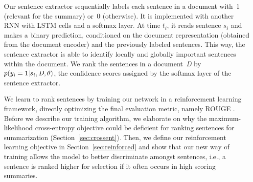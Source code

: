 \documentclass[11pt,a4paper]{article}
\newcommand\doc{{\it D }}
\begin{document}
Our sentence extractor sequentially labels each sentence in a document
with~$1$ (relevant for the summary) or~$0$ (otherwise). It is
implemented with another RNN with LSTM cells and a softmax layer. At
time $t_i$, it reads sentence $s_i$ and makes a binary prediction,
conditioned on the document representation (obtained from the document
encoder) and the previously labeled sentences. This way, the sentence
extractor is able to identify locally and globally important sentences
within the document. We rank the sentences in a document~\doc by
\mbox{$p(y_i=1 | s_i,\doc,\theta)$}, the confidence scores assigned by
the softmax layer of the sentence extractor.








We learn to rank sentences by training our network in a reinforcement
learning framework, directly optimizing the final evaluation metric,
namely ROUGE \cite{rouge}. Before we describe our training algorithm,
we elaborate on why the maximum-likelihood cross-entropy objective
could be deficient for ranking sentences for summarization
(Section~\ref{sec:crossent}). Then, we define our reinforcement
learning objective in Section~\ref{sec:reinforced} and show that our
new way of training allows the model to better discriminate amongst
sentences, i.e., a sentence is ranked higher for selection if it often
occurs in high scoring summaries.
\end{document}
